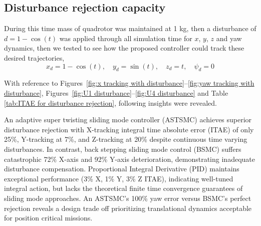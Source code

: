 \subsection{ Disturbance rejection capacity}

During this time mass of quadrotor was maintained at 1 kg, then a disturbance of 
$d = 1 - \cos(t)$ was applied through all simulation time for $x$, $y$, $z$ and yaw 
dynamics, then we tested to see how the proposed controller could track these 
desired trajectories,
\begin{equation}
x_d = 1 - \cos(t), \quad y_d = \sin(t), \quad z_d = t, \quad \psi_d = 0
\end{equation}


With reference to Figures~\ref{fig:x tracking with disturbance}--\ref{fig:yaw tracking with disturbance}, Figures~\ref{fig:U1 disturbance}--\ref{fig:U4 disturbance} and Table \ref{tab:ITAE for disturbance rejection}, following insights 
were revealed.


An adaptive super twisting sliding mode controller (ASTSMC) achieves superior 
disturbance rejection with X-tracking integral time absolute error (ITAE) of only 
25\%, Y-tracking at 7\%, and Z-tracking at 20\% despite continuous time varying 
disturbances. In contrast, back stepping sliding mode control (BSMC) suffers 
catastrophic 72\% X-axis and 92\% Y-axis deterioration, demonstrating inadequate 
disturbance compensation. Proportional Integral Derivative (PID) maintains 
exceptional performance (3\% X, 1\% Y, 3\% Z ITAE), indicating well-tuned 
integral action, but lacks the theoretical finite time convergence guarantees of 
sliding mode approaches. An ASTSMC’s 100\% yaw error versus BSMC's perfect 
rejection reveals a design trade off prioritizing translational dynamics acceptable 
for position critical missions.

